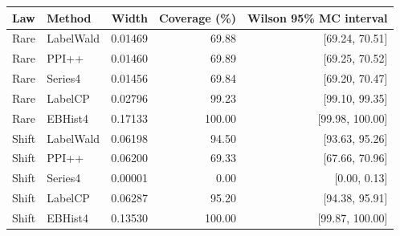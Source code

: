 \begin{tabular}{llrrr}
\toprule
Law & Method & Width & Coverage (\%) & Wilson 95\% MC interval\\
\midrule
Rare & LabelWald & 0.01469 & 69.88 & [69.24, 70.51]\\
Rare & PPI++ & 0.01460 & 69.89 & [69.25, 70.52]\\
Rare & Series4 & 0.01456 & 69.84 & [69.20, 70.47]\\
Rare & LabelCP & 0.02796 & 99.23 & [99.10, 99.35]\\
Rare & EBHist4 & 0.17133 & 100.00 & [99.98, 100.00]\\
Shift & LabelWald & 0.06198 & 94.50 & [93.63, 95.26]\\
Shift & PPI++ & 0.06200 & 69.33 & [67.66, 70.96]\\
Shift & Series4 & 0.00001 & 0.00 & [0.00, 0.13]\\
Shift & LabelCP & 0.06287 & 95.20 & [94.38, 95.91]\\
Shift & EBHist4 & 0.13530 & 100.00 & [99.87, 100.00]\\
\bottomrule
\end{tabular}